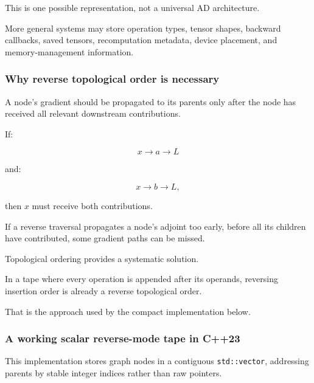 This is one possible representation, not a universal AD architecture.

More general systems may store operation types, tensor shapes, backward callbacks, saved tensors, recomputation metadata, device placement, and memory-management information.

\subsubsection{Why reverse topological order is necessary}\label{02-foundations-ii-ch022-why-reverse-topological-order-is-necessary}

A node's gradient should be propagated to its parents only after the node has received all relevant downstream contributions.

If:

\[
x\rightarrow a\rightarrow L
\]

and:

\[
x\rightarrow b\rightarrow L,
\]

then \(x\) must receive both contributions.

If a reverse traversal propagates a node's adjoint too early, before all its children have contributed, some gradient paths can be missed.

Topological ordering provides a systematic solution.

In a tape where every operation is appended after its operands, reversing insertion order is already a reverse topological order.

That is the approach used by the compact implementation below.

\subsubsection{A working scalar reverse-mode tape in C++23}\label{02-foundations-ii-ch022-a-working-scalar-reverse-mode-tape-in-c23}

This implementation stores graph nodes in a contiguous \texttt{std::vector}, addressing parents by stable integer indices rather than raw pointers.

